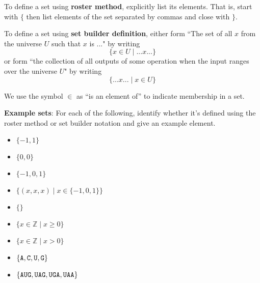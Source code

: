 
To define a set using {\bf roster method}, explicitly list its elements. That is,
start with $\{$ then list elements of 
the set separated by commas and close with $\}$.

To define a set using {\bf set builder definition}, either form 
``The set of all $x$ from the universe $U$ such that $x$ is ..." by writing
\[\{x \in U \mid ...x... \}\]
or form ``the collection of all outputs of some operation when the input ranges over the universe $U$"
by writing
\[\{ ...x... \mid x\in U \}\]

We use the symbol $\in$ as ``is an element of'' to indicate membership in a set.

{\bf Example sets}: For each of the following, identify whether it's defined using the roster method
or set builder notation and give an example element.
\begin{itemize}
    \item[]$\{ -1, 1\}$
    \item[]$\{0, 0 \}$
    \item[]$\{-1, 0, 1 \}$
    \item[]$\{(x,x,x) \mid x \in \{-1,0,1\} \}$
    \item[]$\{ \}$
    \item[]$\{ x \in \mathbb{Z} \mid x \geq 0 \}$
    \item[]$\{ x \in \mathbb{Z}  \mid x > 0 \}$
    \item[]$\{\texttt{A},\texttt{C},\texttt{U},\texttt{G}\}$ 
    \item[]$\{\texttt{A}\texttt{U}\texttt{G}, \texttt{U}\texttt{A}\texttt{G}, \texttt{U}\texttt{G}\texttt{A}, \texttt{U}\texttt{A}\texttt{A} \}$
\end{itemize}
\vfill